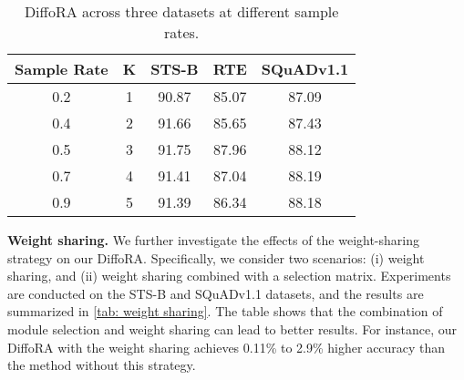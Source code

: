 \begin{table}
  \centering
  \begin{tabular}{c|c|c|c|c}
    \toprule
    Sample Rate&K&STS-B& RTE & SQuADv1.1\\
    \midrule
    0.2  &1& 90.87 &85.07 & 87.09 \\
    0.4  &2& 91.66 & 85.65& 87.43 \\
    0.5  &3& 91.75 & 87.96 & 88.12\\ 
    0.7  &4& 91.41 & 87.04 &88.19\\
    0.9  &5& 91.39 &86.34 & 88.18\\
    \bottomrule
  \end{tabular}
  \caption{DiffoRA across three datasets at different sample rates.}
  \label{tab: sample rate}
\end{table}



\noindent\textbf{Weight sharing.} We further investigate the effects of the weight-sharing strategy on our DiffoRA. Specifically, we consider two scenarios: (i) weight sharing, and (ii) weight sharing combined with a selection matrix. 
Experiments are conducted on the STS-B and SQuADv1.1 datasets, and the results are summarized in \cref{tab: weight sharing}. 
The table shows that the combination of module selection and weight sharing can lead to better results. For instance, our DiffoRA with the weight sharing achieves 0.11\% to 2.9\% higher accuracy than the method without this strategy. 




